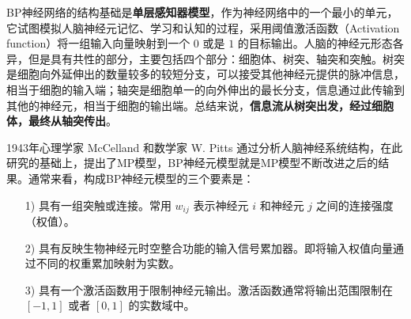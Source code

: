 \documentclass[UTF8]{ctexart}
\begin{document}
BP神经网络的结构基础是\textbf{单层感知器模型}，作为神经网络中的一个最小的单元，它试图模拟人脑神经元记忆、学习和认知的过程，采用阈值激活函数（Activation function）将一组输入向量映射到一个 $0$ 或是 $1$ 的目标输出。人脑的神经元形态各异，但是具有共性的部分，主要包括四个部分：细胞体、树突、轴突和突触。树突是细胞向外延伸出的数量较多的较短分支，可以接受其他神经元提供的脉冲信息，相当于细胞的输入端；轴突是细胞单一的向外伸出的最长分支，信息通过此传输到其他的神经元，相当于细胞的输出端。总结来说，\textbf{信息流从树突出发，经过细胞体，最终从轴突传出}。

1943年心理学家 McCelland 和数学家 W. Pitts 通过分析人脑神经系统结构，在此研究的基础上，提出了MP模型，BP神经元模型就是MP模型不断改进之后的结果。通常来看，构成BP神经元模型的三个要素是：

\begin{itemize}
\item [1)]
具有一组突触或连接。常用 $w_{ij}$ 表示神经元 $i$ 和神经元 $j$ 之间的连接强度（权值）。
\item [2)]
具有反映生物神经元时空整合功能的输入信号累加器。即将输入权值向量通过不同的权重累加映射为实数。
\item [3)]
具有一个激活函数用于限制神经元输出。激活函数通常将输出范围限制在 $[-1,1]$ 或者 $[0,1]$ 的实数域中。
\end{itemize}
\end{document}

